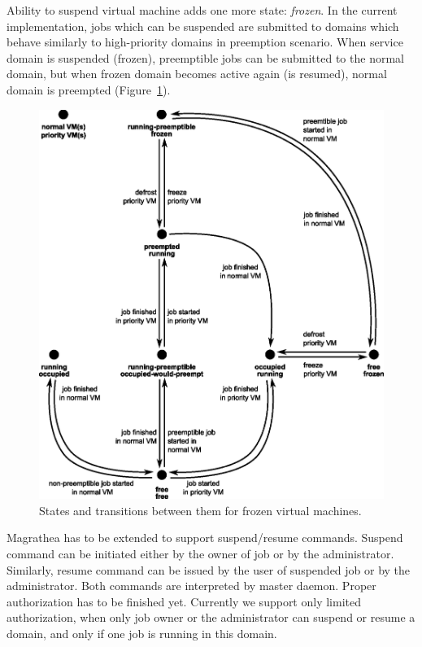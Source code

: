 \documentclass{sig-alternate}
\begin{document}
Ability to suspend virtual machine adds one more state: \textit{frozen}.
In the current implementation, jobs which can be suspended are submitted
to domains which behave similarly to high-priority domains in preemption
scenario. When service domain is suspended (frozen), preemptible jobs can
be submitted to the normal domain, but when frozen domain becomes active
again (is resumed), normal domain is preempted (Figure~\ref{fig:frozen}).

\begin{figure}[tb]
    \includegraphics[width=\columnwidth]{frozen}
    \caption{States and transitions between them for frozen
        virtual machines.}
    \label{fig:frozen}
\end{figure}

Magrathea has to be extended to support suspend/resume commands. Suspend command can be initiated either
by the owner
of job or by the administrator. Similarly, resume command can be issued by
the user of suspended job or by the administrator. Both
commands are interpreted by master daemon.
Proper authorization has to be finished yet.
Currently we support only limited authorization, when only job owner or
the administrator can suspend or resume a domain, and only if one job is
running in this domain.
\end{document}
